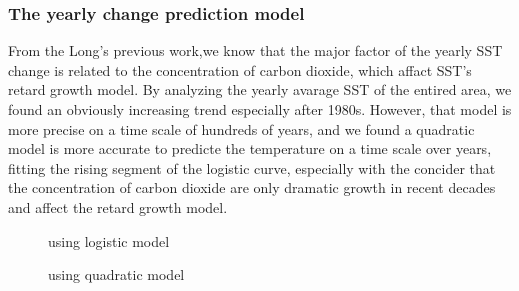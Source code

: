 \documentclass{mcmthesis}
\begin{document}
    

  \subsubsection{The yearly change prediction model}
    From the Long's previous work\cite{long2014fast},we know that the major factor of the yearly SST change is related to the concentration of carbon dioxide, which affact SST's retard growth model. By analyzing the yearly avarage SST of the entired area, we found an obviously increasing trend especially after 1980s. However, that model is more precise on a time scale of hundreds of years, and we found a quadratic model is more accurate to predicte the temperature on a time scale over years, fitting the rising segment of the logistic curve, especially with the concider that the concentration of carbon dioxide are only dramatic growth in recent decades and affect the retard growth model. 

    \begin{figure}[htbp]
      \caption{using logistic model}\label{figure1}
    \end{figure}
    \begin{figure}[htbp]
      \caption{using quadratic model}\label{figure1}
    \end{figure}
    
\end{document}
